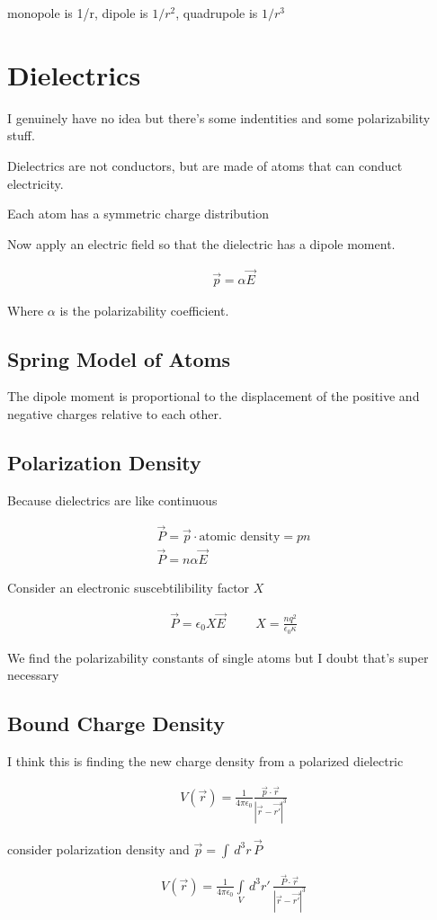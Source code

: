 \documentclass[fleqn]{report}
\newcommand{\hp}{\hspace{1cm}}
\newcommand{\equations} [1] {
\begin{gather*}
#1
\end{gather*}
}
\begin{document}
monopole is 1/r, dipole is $1/r^2$, quadrupole is $1/r^3$

\section{Dielectrics}
I genuinely have no idea but there's some indentities and some polarizability 
stuff. 

Dielectrics are not conductors, but are made of atoms that can conduct 
electricity. 

Each atom has a symmetric charge distribution 

Now apply an electric field so that the dielectric has a dipole moment. 
\equations{
    \vec p = \alpha \vec E
}
Where $\alpha$ is the polarizability coefficient.

\subsection{Spring Model of Atoms}

The dipole moment is proportional to the displacement of the positive 
and negative charges relative to each other. 

\subsection{Polarization Density}
Because dielectrics are like continuous 

\equations{
    \vec P = \vec p \cdot \textrm{atomic density} = pn
    \\
    \vec P = n \alpha \vec E 
}

Consider an electronic suscebtilibility factor $X$ 

\equations{
    \vec P = \epsilon_0 X \vec E 
    \hp 
    X = \frac{n q^2}{\epsilon_0 \kappa}
}

We find the polarizability constants of single atoms but I doubt that's super 
necessary 

\subsection{Bound Charge Density}
I think this is finding the new charge density from a polarized dielectric 

\equations{
    V(\vec r) = 
    \frac{1}{4 \pi \epsilon_0}
    \frac{\vec p \cdot \vec r }{|\vec r - \vec{r'}|^3}
}
consider polarization density and $\vec p = \int \, d^3 r \, \vec P$

\equations{
    V(\vec r) = 
    \frac{1}{4 \pi \epsilon_0}
    \int\limits_{V} \, d^3 r' \, 
    \frac{\vec P \cdot \vec r }{|\vec r - \vec{r'}|^3}
}
\end{document}
